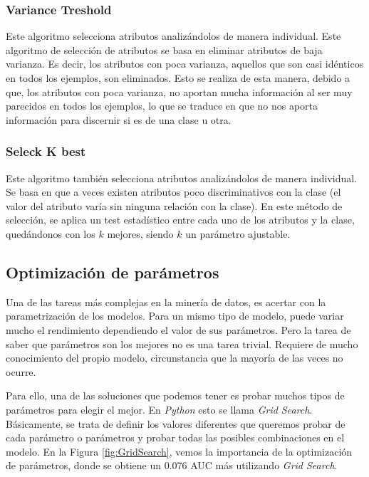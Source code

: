 \subsubsection{Variance Treshold}
Este algoritmo selecciona atributos analizándolos de manera individual. Este algoritmo de selección de atributos se basa en eliminar atributos de baja varianza. Es decir, los atributos con poca varianza, aquellos que son casi idénticos en todos los ejemplos, son eliminados. Esto se realiza de esta manera, debido a que, los atributos con poca varianza, no aportan mucha información al ser muy parecidos en todos los ejemplos, lo que se traduce en que no nos aporta información para discernir si es de una clase u otra.

\subsubsection{Seleck K best}
Este algoritmo también selecciona atributos analizándolos de manera individual. Se basa en que a veces existen atributos poco discriminativos con la clase (el valor del atributo varía sin ninguna relación con la clase). En este método de selección, se aplica un test estadístico entre cada uno de los atributos y la clase, quedándonos con los $k$ mejores, siendo $k$ un parámetro ajustable. 

\subsection{Optimización de parámetros} 
Una de las tareas más complejas en la minería de datos, es acertar con la parametrización de los modelos. Para un mismo tipo de modelo, puede variar mucho el rendimiento dependiendo el valor de sus parámetros. Pero la tarea de saber que parámetros son los mejores no es una tarea trivial. Requiere de mucho conocimiento del propio modelo, circunstancia que la mayoría de las veces no ocurre.

Para ello, una de las soluciones que podemos tener es probar muchos tipos de parámetros para elegir el mejor. En \textit{Python} esto se llama \textit{Grid Search}. Básicamente, se trata de definir los valores diferentes que queremos probar de cada parámetro o parámetros y probar todas las posibles combinaciones en el modelo. En la Figura \ref{fig:GridSearch}, vemos la importancia de la optimización de parámetros, donde se obtiene un 0.076 AUC más utilizando \textit{Grid Search}.


